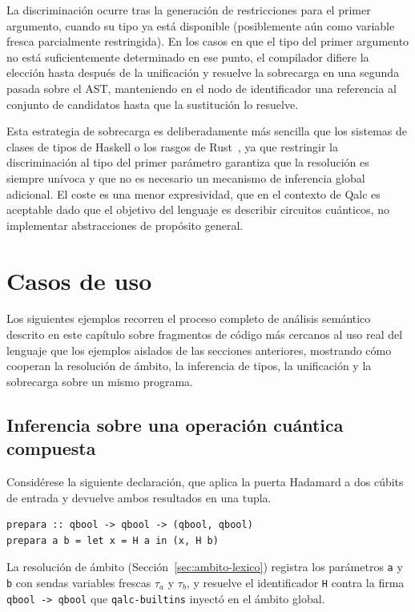 La discriminación ocurre tras la generación de restricciones para el primer argumento, cuando su tipo ya está disponible (posiblemente aún como variable fresca parcialmente restringida). En los casos en que el tipo del primer argumento no está suficientemente determinado en ese punto, el compilador difiere la elección hasta después de la unificación y resuelve la sobrecarga en una segunda pasada sobre el AST, manteniendo en el nodo de identificador una referencia al conjunto de candidatos hasta que la sustitución lo resuelve.

Esta estrategia de sobrecarga es deliberadamente más sencilla que los sistemas de clases de tipos de Haskell o los rasgos de Rust~\cite{matsakis_rust_2014}, ya que restringir la discriminación al tipo del primer parámetro garantiza que la resolución es siempre unívoca y que no es necesario un mecanismo de inferencia global adicional. El coste es una menor expresividad, que en el contexto de Qalc es aceptable dado que el objetivo del lenguaje es describir circuitos cuánticos, no implementar abstracciones de propósito general.

\section{Casos de uso}
\label{sec:casos-uso}

Los siguientes ejemplos recorren el proceso completo de análisis semántico descrito en este capítulo sobre fragmentos de código más cercanos al uso real del lenguaje que los ejemplos aislados de las secciones anteriores, mostrando cómo cooperan la resolución de ámbito, la inferencia de tipos, la unificación y la sobrecarga sobre un mismo programa.

\subsection{Inferencia sobre una operación cuántica compuesta}

Considérese la siguiente declaración, que aplica la puerta Hadamard a dos cúbits de entrada y devuelve ambos resultados en una tupla.

\begin{lstlisting}[language={}, caption=Declaración que combina un bloque let y una tupla sobre valores cuánticos]
prepara :: qbool -> qbool -> (qbool, qbool)
prepara a b = let x = H a in (x, H b)
\end{lstlisting}

La resolución de ámbito (Sección~\ref{sec:ambito-lexico}) registra los parámetros \lstinline|a| y \lstinline|b| con sendas variables frescas $\tau_a$ y $\tau_b$, y resuelve el identificador \lstinline|H| contra la firma \lstinline|qbool -> qbool| que \lstinline|qalc-builtins| inyectó en el ámbito global.

